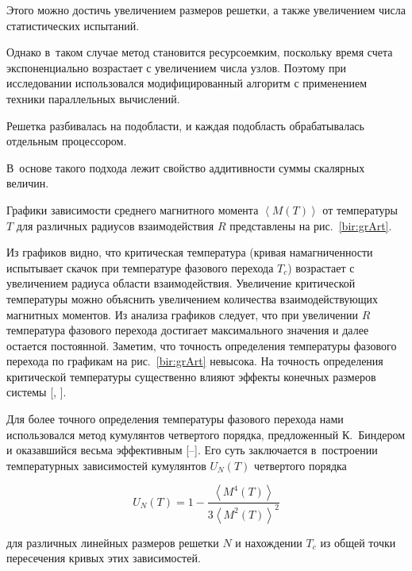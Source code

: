 Этого можно достичь увеличением размеров решетки, а также увеличением числа статистических испытаний. 

Однако в~таком случае метод становится ресурсоемким, поскольку время счета экспоненциально возрастает с увеличением числа узлов. Поэтому при исследовании использовался модифицированный алгоритм с применением техники параллельных вычислений.

Решетка разбивалась на подобласти, и каждая подобласть обрабатывалась отдельным процессором. 

В~основе такого подхода лежит свойство аддитивности суммы скалярных величин.



Графики зависимости среднего магнитного момента $\left <M(T) \right>$ от температуры $T$ для различных радиусов взаимодействия $R$ представлены на рис.~\ref{bir:grArt}. 

Из графиков видно, что критическая температура (кривая намагниченности испытывает  скачок при температуре фазового перехода $T_c$) возрастает с увеличением радиуса области взаимодействия. Увеличение критической температуры можно объяснить увеличением количества взаимодействующих магнитных моментов. Из анализа графиков  следует, что при увеличении $R$ температура фазового перехода достигает максимального значения и далее остается постоянной. Заметим, что точность определения температуры фазового перехода по графикам на рис.~\ref{bir:grArt} невысока.  На точность определения критической температуры существенно влияют эффекты конечных размеров системы [, ].





Для более точного определения температуры фазового перехода нами использовался метод кумулянтов четвертого порядка, предложенный К.~Биндером и оказавшийся весьма эффективным [--]. Его суть заключается в~построении температурных зависимостей кумулянтов $U_{N}(T)$ четвертого порядка

\begin{equation}

U_{N}(T) = 1 - \dfrac{\left <M^{4}(T) \right >}{3 \left  <M^{2}(T) \right >^2}

\end{equation}

для различных линейных размеров решетки $N$ и нахождении $T_c$ из общей точки пересечения кривых этих зависимостей.



